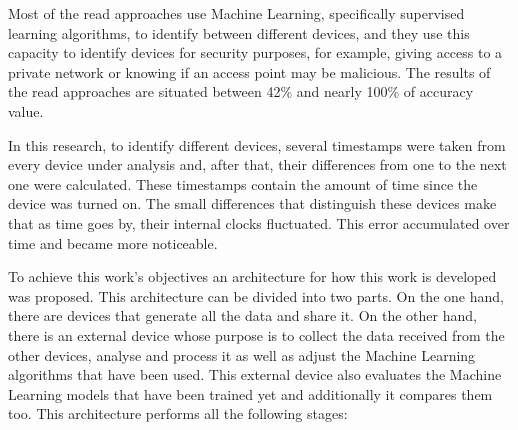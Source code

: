 Most of the read approaches use Machine Learning, specifically supervised learning algorithms, to identify between different devices, and they use this capacity to identify devices for security purposes, for example, giving access to a private network or knowing if an access point may be malicious. The results of the read approaches are situated between 42\% and nearly 100\% of accuracy value. 

In this research, to identify different devices, several timestamps were taken from every device under analysis and, after that, their differences from one to the next one were calculated. These timestamps contain the amount of time since the device was turned on. The small differences that distinguish these devices make that as time goes by, their internal clocks fluctuated. This error accumulated over time and became more noticeable.

To achieve this work's objectives an architecture for how this work is developed was proposed. This architecture can be divided into two parts. On the one hand, there are devices that generate all the data and share it. On the other hand, there is an external device whose purpose is to collect the data received from the other devices, analyse and process it as well as adjust the Machine Learning algorithms that have been used. This external device also evaluates the Machine Learning models that have been trained yet and additionally it compares them too. This architecture performs all the following stages:

